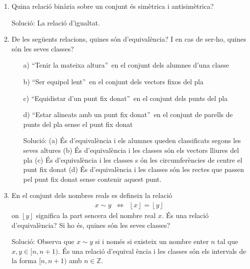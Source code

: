 \begin{enumerate}
\item Quina relaci\'{o} bin\`{a}ria sobre un conjunt \'{e}s sim\`{e}trica i
antisim\`{e}trica?

Soluci\'{o}: La relaci\'{o} d'igualtat.

\item De les seg\"{u}ents relacions, quines s\'{o}n d'equival\`{e}ncia? I en
cas de ser-ho, quines s\'{o}n les seves classes?

\begin{enumerate}
\item[a)] \textquotedblleft Tenir la mateixa altura\textquotedblright\ en el
conjunt dels alumnes d'una classe

\item[b)] \textquotedblleft Ser equipol\textperiodcentered
lent\textquotedblright\ en el conjunt dels vectors fixos del pla

\item[c)] \textquotedblleft Equidistar d'un punt fix
donat\textquotedblright\ en el conjunt dels punts del pla

\item[d)] \textquotedblleft Estar alineats amb un punt fix
donat\textquotedblright\ en el conjunt de parells de punts del pla sense el
punt fix donat

Soluci\'{o}: (a) \'{E}s d'equival\`{e}ncia i els alumnes queden classificats
segons les seves altures (b) \'{E}s d'equival\`{e}ncia i les classes s\'{o}n
els vectors lliures del pla (c) \'{E}s d'equival\`{e}ncia i les classes s%
\'{o}n les circumfer\`{e}ncies de centre el punt fix donat (d) \'{E}s
d'equival\`{e}ncia i les classes s\'{o}n les rectes que passen pel punt fix
donat sense contenir aquest punt.
\end{enumerate}

\item En el conjunt dels nombres reals es defineix la relaci\'{o}%
\begin{equation*}
\begin{array}{ccc}
x\sim y & \Longleftrightarrow & \left\lfloor x\right\rfloor =\left\lfloor
y\right\rfloor%
\end{array}%
\end{equation*}%
on $\left\lfloor y\right\rfloor $ significa la part sencera del nombre real $%
x$. \'{E}s una relaci\'{o} d'equival\`{e}ncia? Si ho \'{e}s, quines s\'{o}n
les seves classes?

Soluci\'{o}: Observa que $x\sim y$ si i nom\'{e}s si existeix un nombre
enter $n$ tal que $x,y\in \lbrack n,n+1)$. \'{E}s una relaci\'{o} d'equival%
\`{e}ncia i les classes s\'{o}n els intervals de la forma $[n,n+1)$ amb $%
n\in \mathbb{Z}$.


\end{enumerate}
